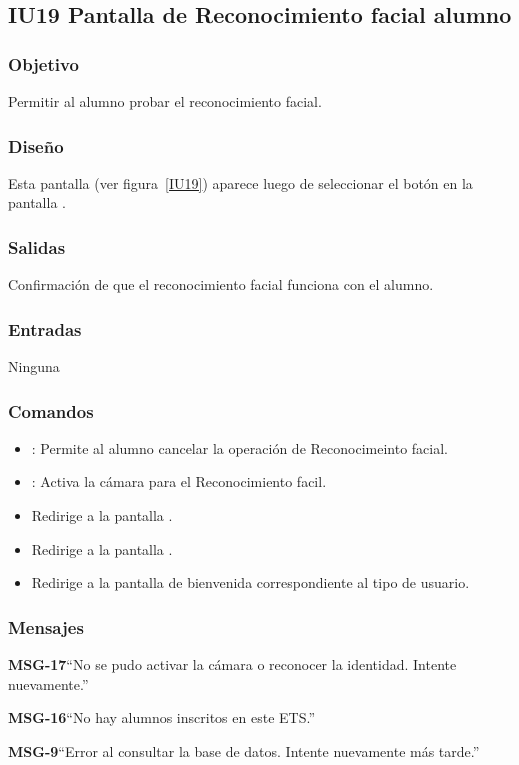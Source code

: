 \subsection{IU19 Pantalla de Reconocimiento facial alumno}

\subsubsection{Objetivo}
Permitir al alumno probar el reconocimiento facial.

\subsubsection{Diseño}
Esta pantalla  (ver figura~\ref{IU19}) aparece luego de seleccionar el botón  en la pantalla .


\subsubsection{Salidas}
Confirmación de que el reconocimiento facial funciona con el alumno.

\subsubsection{Entradas}
Ninguna

\subsubsection{Comandos}
\begin{itemize}
    \item {}: Permite al alumno cancelar la operación de Reconocimeinto facial.
    \item {}: Activa la cámara para el Reconocimiento facil. 
    \item {} Redirige a la pantalla .
    \item {} Redirige a la pantalla .
    \item {} Redirige a la pantalla de bienvenida correspondiente al tipo de usuario.
\end{itemize}

\subsubsection{Mensajes}

\begin{Citemize}
    \item {\bf MSG-17}{``No se pudo activar la cámara o reconocer la identidad. Intente nuevamente.''}
    \item {\bf MSG-16}{``No hay alumnos inscritos en este ETS.''}
    \item {\bf MSG-9}{``Error al consultar la base de datos. Intente nuevamente más tarde.''}
\end{Citemize}